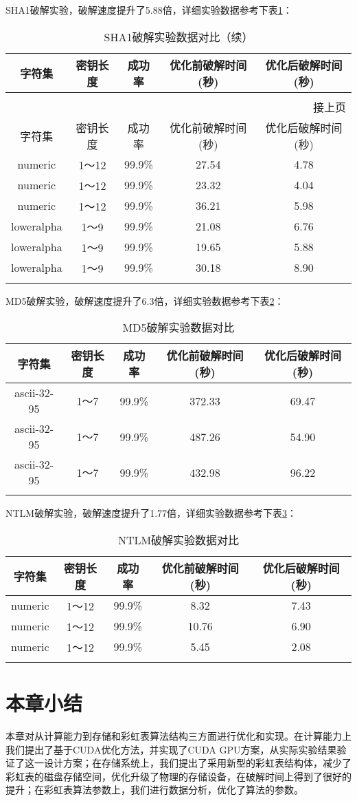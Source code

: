 SHA1破解实验，破解速度提升了5.88倍，详细实验数据参考下表\ref{tab:5.5}：
\begin{longtable}{@{\extracolsep{\fill}}ccccc}
\caption{SHA1破解实验数据对比}\\\toprule[1pt]
\multicolumn{1}{c}{字符集} &
\multicolumn{1}{c}{密钥长度} &
\multicolumn{1}{c}{成功率} &
\multicolumn{1}{c}{优化前破解时间(秒)}&
\multicolumn{1}{c}{优化后破解时间(秒)}\\\midrule
\endfirsthead
\caption[]{SHA1破解实验数据对比（续）}\\
\multicolumn{5}{r}{\footnotesize 接上页}\\
\toprule[1pt]
\multicolumn{1}{c}{字符集} &
\multicolumn{1}{c}{密钥长度} &
\multicolumn{1}{c}{成功率} &
\multicolumn{1}{c}{优化前破解时间(秒)}&
\multicolumn{1}{c}{优化后破解时间(秒)}\\\endhead
numeric & 1～12 & 99.9\% & 27.54 & 4.78 \\
numeric & 1～12 & 99.9\% & 23.32 & 4.04 \\
numeric & 1～12 & 99.9\% & 36.21 & 5.98 \\\hline
loweralpha & 1～9 & 99.9\% & 21.08 & 6.76 \\
loweralpha & 1～9 & 99.9\% & 19.65 & 5.88 \\
loweralpha & 1～9 & 99.9\% & 30.18 & 8.90 \\
\bottomrule[1pt]
\label{tab:5.5}
\end{longtable}
MD5破解实验，破解速度提升了6.3倍，详细实验数据参考下表\ref{tab:5.6}：
\begin{longtable}{@{\extracolsep{\fill}}ccccc}
\caption{MD5破解实验数据对比}\\\toprule[1pt]
\multicolumn{1}{c}{字符集} &
\multicolumn{1}{c}{密钥长度} &
\multicolumn{1}{c}{成功率} &
\multicolumn{1}{c}{优化前破解时间(秒)}&
\multicolumn{1}{c}{优化后破解时间(秒)}\\\midrule
ascii-32-95 & 1～7 & 99.9\% & 372.33 & 69.47 \\
ascii-32-95 & 1～7 & 99.9\% & 487.26 & 54.90 \\
ascii-32-95 & 1～7 & 99.9\% & 432.98 & 96.22 \\
\bottomrule[1pt]
\label{tab:5.6}
\end{longtable}
NTLM破解实验，破解速度提升了1.77倍，详细实验数据参考下表\ref{tab:5.7}：
\begin{longtable}{@{\extracolsep{\fill}}ccccc}
\caption{NTLM破解实验数据对比}\\\toprule[1pt]
\multicolumn{1}{c}{字符集} &
\multicolumn{1}{c}{密钥长度} &
\multicolumn{1}{c}{成功率} &
\multicolumn{1}{c}{优化前破解时间(秒)}&
\multicolumn{1}{c}{优化后破解时间(秒)}\\\midrule
numeric & 1～12 & 99.9\% & 8.32 & 7.43 \\
numeric & 1～12 & 99.9\% & 10.76 & 6.90 \\
numeric & 1～12 & 99.9\% & 5.45 & 2.08 \\
\bottomrule[1pt]
\label{tab:5.7}
\end{longtable}

\section{本章小结}
本章对从计算能力到存储和彩虹表算法结构三方面进行优化和实现。在计算能力上我们提出了基于CUDA优化方法，并实现了CUDA GPU方案，从实际实验结果验证了这一设计方案；在存储系统上，我们提出了采用新型的彩虹表结构体，减少了彩虹表的磁盘存储空间，优化升级了物理的存储设备，在破解时间上得到了很好的提升；在彩虹表算法参数上，我们进行数据分析，优化了算法的参数。


